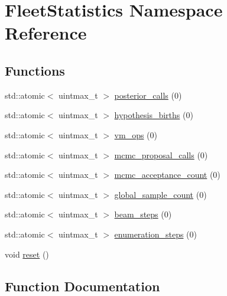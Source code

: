 \hypertarget{namespace_fleet_statistics}{}\section{Fleet\+Statistics Namespace Reference}
\label{namespace_fleet_statistics}
\subsection*{Functions}
\begin{DoxyCompactItemize}
\item 
std\+::atomic$<$ uintmax\+\_\+t $>$ \hyperlink{namespace_fleet_statistics_a6dadb4af01dd69f64cbdf10bdcc3cd68}{posterior\+\_\+calls} (0)
\item 
std\+::atomic$<$ uintmax\+\_\+t $>$ \hyperlink{namespace_fleet_statistics_a1616a32e08aa997f52c5b85a604ef9e5}{hypothesis\+\_\+births} (0)
\item 
std\+::atomic$<$ uintmax\+\_\+t $>$ \hyperlink{namespace_fleet_statistics_ad64460a8eef2b5d661f5cf19a02e9480}{vm\+\_\+ops} (0)
\item 
std\+::atomic$<$ uintmax\+\_\+t $>$ \hyperlink{namespace_fleet_statistics_a1f9e34ed6f510be04fe18bc41d07be49}{mcmc\+\_\+proposal\+\_\+calls} (0)
\item 
std\+::atomic$<$ uintmax\+\_\+t $>$ \hyperlink{namespace_fleet_statistics_ad26d3ef814229c9d5a652a44449bca21}{mcmc\+\_\+acceptance\+\_\+count} (0)
\item 
std\+::atomic$<$ uintmax\+\_\+t $>$ \hyperlink{namespace_fleet_statistics_a52f04256509fd8aa658d16b1bf459060}{global\+\_\+sample\+\_\+count} (0)
\item 
std\+::atomic$<$ uintmax\+\_\+t $>$ \hyperlink{namespace_fleet_statistics_a13faa4e67945448f10b9ef6ec95be578}{beam\+\_\+steps} (0)
\item 
std\+::atomic$<$ uintmax\+\_\+t $>$ \hyperlink{namespace_fleet_statistics_abc4e1ca48b955eaf7fb6c16d07757023}{enumeration\+\_\+steps} (0)
\item 
void \hyperlink{namespace_fleet_statistics_a84ed12eec0dea83a0b4bba34e2362985}{reset} ()
\end{DoxyCompactItemize}


\subsection{Function Documentation}
\mbox{\label{namespace_fleet_statistics_a13faa4e67945448f10b9ef6ec95be578}} 
